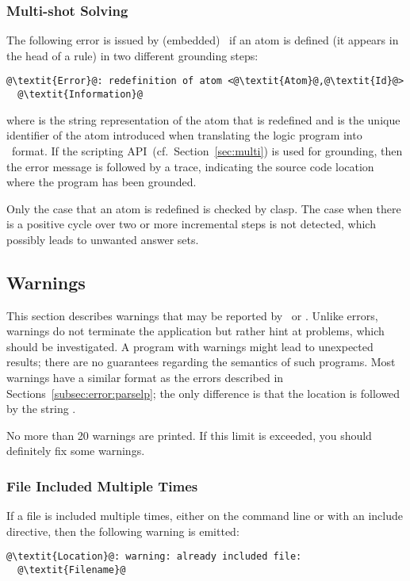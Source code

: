 \subsubsection{Multi-shot Solving}
The following error is issued by (embedded) \clasp\ if an atom is defined (it appears in the head of a rule) in two different grounding steps:
\begin{lstlisting}[numbers=none,escapechar=@]
@\textit{Error}@: redefinition of atom <@\textit{Atom}@,@\textit{Id}@>
  @\textit{Information}@
\end{lstlisting}
where  is the string representation of the atom that is redefined
and  is the unique identifier of the atom introduced when translating the logic program into \smodels\ format.
If the scripting API~(cf.~Section~\ref{sec:multi}) is used for grounding,
then the error message is followed by a trace,
indicating the source code location where the program has been grounded.

\begin{note}
Only the case that an atom is redefined is checked by clasp.
The case when there is a positive cycle over two or more incremental steps is not detected,
which possibly leads to unwanted answer sets.
\end{note}

\subsection{Warnings}\label{subsec:warn}

This section describes warnings that may be reported by \gringo\ or \clingo.
Unlike errors, warnings do not terminate the application 
but rather hint at problems, which should be investigated.
A program with warnings might lead to unexpected results;
there are no guarantees regarding the semantics of such programs.
Most warnings have a similar format as the errors described in Sections~\ref{subsec:error:parselp};
the only difference is that the location is followed by the string .

\begin{note}
No more than 20 warnings are printed.
If this limit is exceeded, you should definitely fix some warnings.
\end{note}

\subsubsection{File Included Multiple Times}\label{sec:warn:incfile}
If a file is included multiple times,
either on the command line or with an include directive,
then the following warning is emitted:
\begin{lstlisting}[numbers=none,escapechar=@]
@\textit{Location}@: warning: already included file:
  @\textit{Filename}@
\end{lstlisting}

